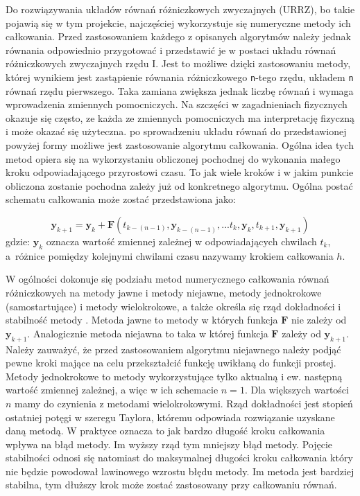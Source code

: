 Do rozwiązywania układów równań różniczkowych zwyczajnych (URRZ), bo takie pojawią się w tym projekcie, najczęściej wykorzystuje się numeryczne metody ich całkowania. Przed zastosowaniem każdego z opisanych algorytmów należy jednak równania odpowiednio przygotować i przedstawić je w postaci układu równań różniczkowych zwyczajnych rzędu I. Jest to możliwe dzięki zastosowaniu metody, której wynikiem jest zastąpienie równania różniczkowego \texttt{n}-tego rzędu, układem \texttt{n} równań rzędu pierwszego. Taka zamiana zwiększa jednak liczbę równań i wymaga wprowadzenia zmiennych pomocniczych. Na szczęści w zagadnieniach fizycznych okazuje się często, ze każda ze zmiennych pomocniczych ma interpretację fizyczną i może okazać się użyteczna. po sprowadzeniu układu równań do przedstawionej powyżej formy możliwe jest zastosowanie algorytmu całkowania. Ogólna idea tych metod opiera się na wykorzystaniu obliczonej pochodnej do wykonania małego kroku odpowiadającego przyrostowi czasu. To jak wiele kroków i w jakim punkcie obliczona zostanie pochodna zależy już od konkretnego algorytmu.
Ogólna postać schematu całkowania może zostać przedstawiona jako:

\[
	\bm{y}_{k+1} = \bm{y}_{k} + \bm{F} \left( t_{k-(n-1)}, \bm{y}_{k-(n-1)}, ... t_{k}, \bm{y}_{k},  t_{k+1}, \bm{y}_{k+1}  \right)
\]
gdzie: $\bm{y}_{k}$ oznacza wartość zmiennej zależnej w odpowiadających chwilach $t_{k}$, a~różnice pomiędzy kolejnymi chwilami czasu nazywamy krokiem całkowania $h$.
 

W ogólności dokonuje się podziału metod numerycznego całkowania równań różniczkowych na metody jawne i metody niejawne, metody jednokrokowe (samostartujące) i metody wielokrokowe, a także określa się rząd dokładności i stabilność metody \cite{met_num_szum}. Metoda jawne to metody w których funkcja $\bm{F}$ nie zależy od $\bm{y}_{k+1}$. Analogicznie metoda niejawna to taka w której funkcja $\bm{F}$ zależy od $\bm{y}_{k+1}$. Należy zauważyć, że przed zastosowaniem algorytmu niejawnego należy podjąć pewne kroki mające na celu przekształcić funkcję uwikłaną do funkcji prostej. Metody jednokrokowe to metody wykorzystujące tylko aktualną i ew. następną wartość zmiennej zależnej, a więc w ich schemacie $n = 1$. Dla większych wartości $n$ mamy do czynienia z metodami wielokrokowymi. Rząd dokładności jest stopień ostatniej potęgi w szeregu Taylora, któremu odpowiada rozwiązanie uzyskane daną metodą. W praktyce oznacza to jak bardzo długość kroku całkowania wpływa na błąd metody. Im wyższy rząd tym mniejszy błąd metody. Pojęcie stabilności odnosi się natomiast do maksymalnej długości kroku całkowania który nie będzie powodował lawinowego wzrostu błędu metody. Im metoda jest bardziej stabilna, tym dłuższy krok może zostać zastosowany przy całkowaniu równań.\\

